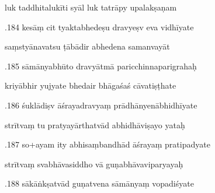 \documentclass[article,12pt,a4paper]{memoir}%
\newcounter{parCount}
\begin{document}
	  
	  \pstart \leavevmode%
	luk taddhitalukīti syāl luk tatrāpy upalakṣaṇam 
	{}
	\pend%
      

	  
	  \pstart {}.184 kesāṃ cit tyaktabhedeṣu dravyeṣv eva vidhīyate 
	{}
	\pend%
      

	  
	  \pstart \leavevmode%
	saṃstyānavatsu ṭābādir abhedena samanvayāt 
	{}
	\pend%
      

	  
	  \pstart {}.185 sāmānyabhūto dravyātmā   paricchinnaparigrahaḥ 
	{}
	\pend%
      

	  
	  \pstart \leavevmode%
	kriyābhir yujyate bhedair bhāgaśaś cāvatiṣṭhate 
	{}
	\pend%
      

	  
	  \pstart {}.186 śuklādiṣv āśrayadravyaṃ   prādhānyenābhidhīyate 
	{}
	\pend%
      

	  
	  \pstart \leavevmode%
	strītvaṃ tu pratyayārthatvād abhidhāviṣayo yataḥ 
	{}
	\pend%
      

	  
	  \pstart {}.187 so+ayam ity abhisaṃbandhād āśrayaṃ pratipadyate 
	{}
	\pend%
      

	  
	  \pstart \leavevmode%
	strītvaṃ svabhāvasiddho vā guṇabhāvaviparyayaḥ 
	{}
	\pend%
      

	  
	  \pstart {}.188 sākāṅkṣatvād guṇatvena sāmānyaṃ vopadiśyate 
	{}
	\pend%
      
\end{document}
